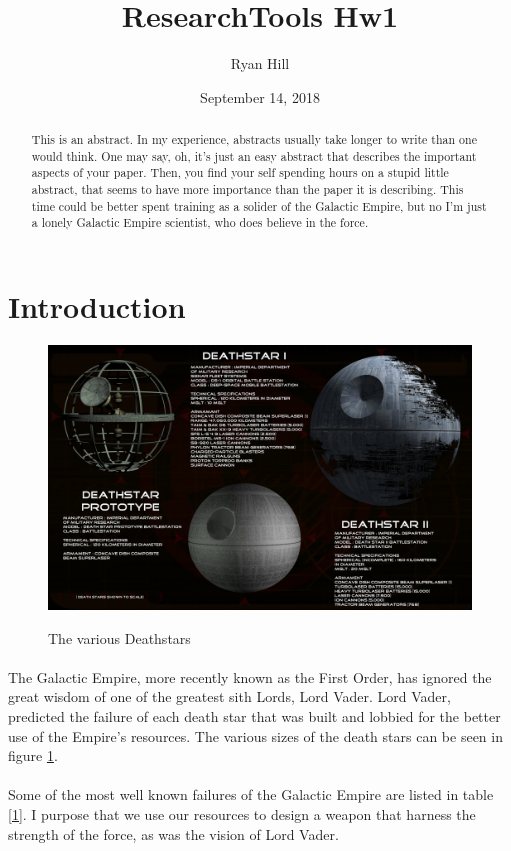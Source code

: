 \documentclass[12pt]{article}
\title{ResearchTools Hw1}
\author{Ryan Hill}
\date{September 14, 2018}
\begin{document}
\maketitle
\begin{abstract}
    This is an abstract. In my experience, abstracts usually take longer to write than one would think. One may say, oh, it's just an easy abstract that describes the important aspects of your paper. Then, you find your self spending hours on a stupid little abstract, that seems to have more importance than the paper it is describing. This time could be better spent training as a solider of the Galactic Empire, but no I'm just a lonely Galactic Empire scientist, who does believe in the force.
\end{abstract}

\section{Introduction}
\begin{figure}
\caption{The various Deathstars}
\includegraphics[scale=.1]{./Deathstar.jpg}
\label{DeathStar}
\end{figure}


\paragraph{}
The Galactic Empire, more recently known as the First Order, has ignored the great wisdom of one of the greatest sith Lords, Lord Vader. Lord Vader, predicted the failure of each death star that was built and lobbied for the better use of the Empire's resources. The various sizes of the death stars can be seen in figure \ref{DeathStar}. 

\paragraph{}
Some of the most well known failures of the Galactic Empire are listed in table \ref{1}. I purpose that we use our resources to design a weapon that harness the strength of the force, as was the vision of Lord Vader.
\end{document}
